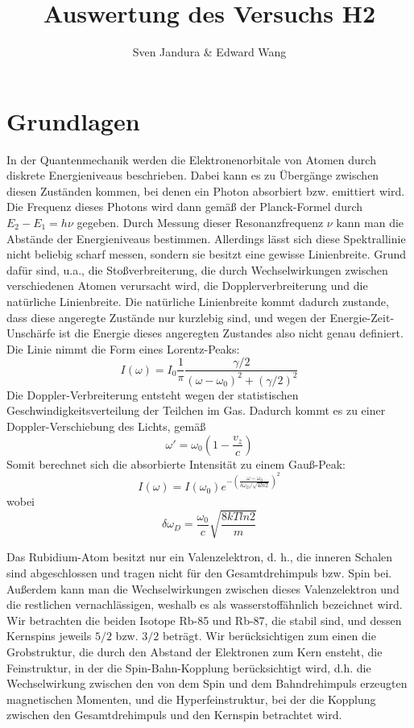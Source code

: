 \documentclass[a4paper,parskip]{scrartcl}
\author{Sven Jandura \& Edward Wang}
\title{Auswertung des Versuchs H2}
\begin{document}
\maketitle

\tableofcontents

\section{Grundlagen}

In der Quantenmechanik werden die Elektronenorbitale von Atomen durch diskrete Energieniveaus beschrieben. Dabei kann es zu Übergänge zwischen diesen Zuständen kommen, bei denen ein Photon absorbiert bzw. emittiert wird. Die Frequenz dieses Photons wird dann gemäß der Planck-Formel durch $E_2 - E_1 = h \nu$ gegeben. Durch Messung dieser Resonanzfrequenz $\nu$ kann man die Abstände der Energieniveaus bestimmen. Allerdings lässt sich diese Spektrallinie nicht beliebig scharf messen, sondern sie besitzt eine gewisse Linienbreite. Grund dafür sind, u.a., die Stoßverbreiterung, die durch Wechselwirkungen zwischen verschiedenen Atomen verursacht wird, die Dopplerverbreiterung und die natürliche Linienbreite. Die natürliche Linienbreite kommt dadurch zustande, dass diese angeregte Zustände nur kurzlebig sind, und wegen der Energie-Zeit-Unschärfe ist die Energie dieses angeregten Zustandes also nicht genau definiert. Die Linie nimmt die Form eines Lorentz-Peaks:
\begin{equation*}
    I(\omega) = I_0 \frac{1}{\pi} \frac{\gamma/2}{(\omega - \omega_0)^2 + (\gamma / 2)^2}
\end{equation*}
Die Doppler-Verbreiterung entsteht wegen der statistischen Geschwindigkeitsverteilung der Teilchen im Gas. Dadurch kommt es zu einer Doppler-Verschiebung des Lichts, gemäß
\begin{equation*}
    \omega' = \omega_0 \left(1 - \frac{v_z}{c} \right)
\end{equation*}
Somit berechnet sich die absorbierte Intensität zu einem Gauß-Peak:
\begin{equation*}
    I(\omega) = I(\omega_0) e^{- \left( \frac{\omega - \omega_0}{\delta \omega_D/\sqrt{4 ln 2}} \right)^2}
\end{equation*}
wobei
\begin{equation*}
    \delta \omega_D = \frac{\omega_0}{c} \sqrt{\frac{8 kT ln2}{m}}
\end{equation*}

Das Rubidium-Atom besitzt nur ein Valenzelektron, d. h., die inneren Schalen sind abgeschlossen und tragen nicht für den Gesamtdrehimpuls bzw. Spin bei. Außerdem kann man die Wechselwirkungen zwischen dieses Valenzelektron und die restlichen vernachlässigen, weshalb es als wasserstoffähnlich bezeichnet wird. Wir betrachten die beiden Isotope Rb-85 und Rb-87, die stabil sind, und dessen Kernspins jeweils $5/2$ bzw. $3/2$ beträgt. Wir berücksichtigen zum einen die Grobstruktur, die durch den Abstand der Elektronen zum Kern ensteht, die Feinstruktur, in der die Spin-Bahn-Kopplung berücksichtigt wird, d.h. die Wechselwirkung zwischen den von dem Spin und dem Bahndrehimpuls erzeugten magnetischen Momenten, und die Hyperfeinstruktur, bei der die Kopplung zwischen den Gesamtdrehimpuls und den Kernspin betrachtet wird.
\end{document}
